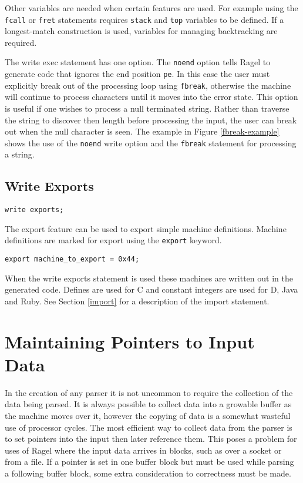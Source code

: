 \documentclass[letterpaper,11pt,oneside]{book}
\newcommand{\verbspace}{\vspace{10pt}}
\begin{document}
Other variables are needed when certain features are used. For example using
the \verb|fcall| or \verb|fret| statements requires \verb|stack| and
\verb|top| variables to be defined. If a longest-match construction is used,
variables for managing backtracking are required.

The write exec statement has one option. The \verb|noend| option tells Ragel
to generate code that ignores the end position \verb|pe|. In this
case the user must explicitly break out of the processing loop using
\verb|fbreak|, otherwise the machine will continue to process characters until
it moves into the error state. This option is useful if one wishes to process a
null terminated string. Rather than traverse the string to discover then length
before processing the input, the user can break out when the null character is
seen.  The example in Figure \ref{fbreak-example} shows the use of the
\verb|noend| write option and the \verb|fbreak| statement for processing a string.

\subsection{Write Exports}
\label{export}

\begin{verbatim}
write exports;
\end{verbatim}
\verbspace

The export feature can be used to export simple machine definitions. Machine definitions
are marked for export using the \verb|export| keyword.

\begin{verbatim}
export machine_to_export = 0x44;
\end{verbatim}
\verbspace

When the write exports statement is used these machines are 
written out in the generated code. Defines are used for C and constant integers
are used for D, Java and Ruby. See Section \ref{import} for a description of the
import statement.

\section{Maintaining Pointers to Input Data}

In the creation of any parser it is not uncommon to require the collection of
the data being parsed.  It is always possible to collect data into a growable
buffer as the machine moves over it, however the copying of data is a somewhat
wasteful use of processor cycles. The most efficient way to collect data from
the parser is to set pointers into the input then later reference them.  This
poses a problem for uses of Ragel where the input data arrives in blocks, such
as over a socket or from a file. If a pointer is set in one buffer block but
must be used while parsing a following buffer block, some extra consideration
to correctness must be made.
\end{document}
